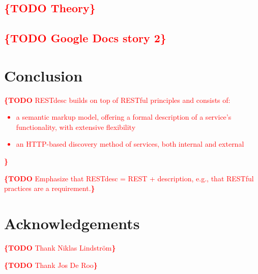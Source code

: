 \documentclass[runningheads,a4paper, twocolumn]{llncs}
\newcommand{\todo}[1]{\noindent\textcolor{red}{{\bf \{TODO} #1{\bf \}}}}
\begin{document}
\subsection{\todo{Theory}}
\subsection{\todo{Google Docs story 2}}


\section{Conclusion}

\todo{RESTdesc builds on top of RESTful principles and consists of:
\begin{itemize}
\item a semantic markup model, offering a formal description of a service's functionality, with extensive flexibility
\item an HTTP-based discovery method of services, both internal and external
\end{itemize}
}

\todo{Emphasize that RESTdesc = REST + description, e.g., that RESTful practices are a requirement.}




\section*{Acknowledgements}
\todo{Thank Niklas Lindstr\"om}

\todo{Thank Jos De Roo}

\renewcommand{\ttdefault}{cmvtt}



\end{document}

